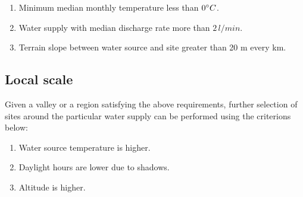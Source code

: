 
\begin{enumerate}

  \item Minimum median monthly temperature less than $0 ^{\circ} C$. 
  \item Water supply with median discharge rate more than $2\, l/min$.
  \item Terrain slope between water source and site greater than 20 m every km. 

\end{enumerate}

\subsection{Local scale}

Given a valley or a region satisfying the above requirements, further selection of sites around the particular
water supply can be performed using the criterions below: 

\begin{enumerate}
  \item Water source temperature is higher.
  \item Daylight hours are lower due to shadows.
  \item Altitude is higher.
\end{enumerate}






